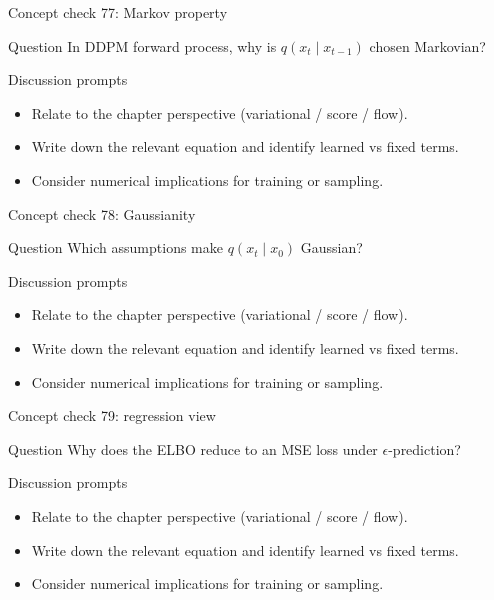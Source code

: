 \documentclass[aspectratio=169]{beamer}
\begin{document}
\begin{frame}{Concept check 77: Markov property}
\begin{block}{Question}
In DDPM forward process, why is \(q(x_t\mid x_{t-1})\) chosen Markovian?
\end{block}
\begin{block}{Discussion prompts}
\begin{itemize}
\item Relate to the chapter perspective (variational / score / flow).
\item Write down the relevant equation and identify learned vs fixed terms.
\item Consider numerical implications for training or sampling.
\end{itemize}
\end{block}
\end{frame}

\begin{frame}{Concept check 78: Gaussianity}
\begin{block}{Question}
Which assumptions make \(q(x_t\mid x_0)\) Gaussian?
\end{block}
\begin{block}{Discussion prompts}
\begin{itemize}
\item Relate to the chapter perspective (variational / score / flow).
\item Write down the relevant equation and identify learned vs fixed terms.
\item Consider numerical implications for training or sampling.
\end{itemize}
\end{block}
\end{frame}

\begin{frame}{Concept check 79: regression view}
\begin{block}{Question}
Why does the ELBO reduce to an MSE loss under \(\epsilon\)-prediction?
\end{block}
\begin{block}{Discussion prompts}
\begin{itemize}
\item Relate to the chapter perspective (variational / score / flow).
\item Write down the relevant equation and identify learned vs fixed terms.
\item Consider numerical implications for training or sampling.
\end{itemize}
\end{block}
\end{frame}
\end{document}
